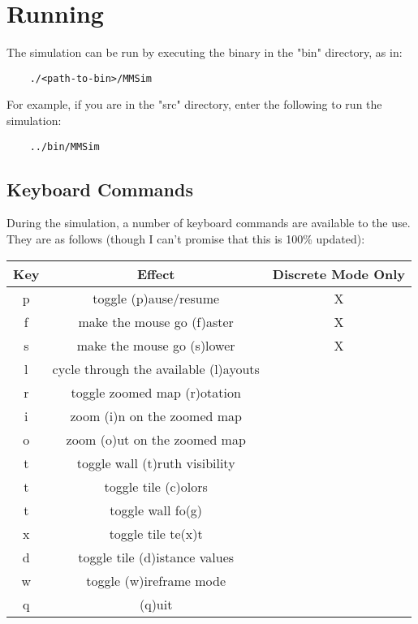 \documentclass[12pt]{article}
\begin{document}
\section{Running}

The simulation can be run by executing the binary in the "bin" directory, as in:
    
\begin{lstlisting}
    ./<path-to-bin>/MMSim
\end{lstlisting}

For example, if you are in the "src" directory, enter the following to run the
simulation:

\begin{lstlisting}
    ../bin/MMSim
\end{lstlisting}

\subsection{Keyboard Commands}

During the simulation, a number of keyboard commands are available to the use.
They are as follows (though I can't promise that this is 100\% updated):

\begin{center}
\begin{tabular}{ c | c | c }
  Key & Effect & Discrete Mode Only\\
\hline
  p & toggle (p)ause/resume & X\\
  f & make the mouse go (f)aster & X\\
  s & make the mouse go (s)lower & X\\
  l & cycle through the available (l)ayouts & \\
  r & toggle zoomed map (r)otation & \\
  i & zoom (i)n on the zoomed map & \\
  o & zoom (o)ut on the zoomed map & \\
  t & toggle wall (t)ruth visibility & \\
  t & toggle tile (c)olors & \\
  t & toggle wall fo(g) & \\
  x & toggle tile te(x)t & \\
  d & toggle tile (d)istance values & \\
  w & toggle (w)ireframe mode & \\
  q & (q)uit & \\
\end{tabular}
\end{center}
\end{document}
